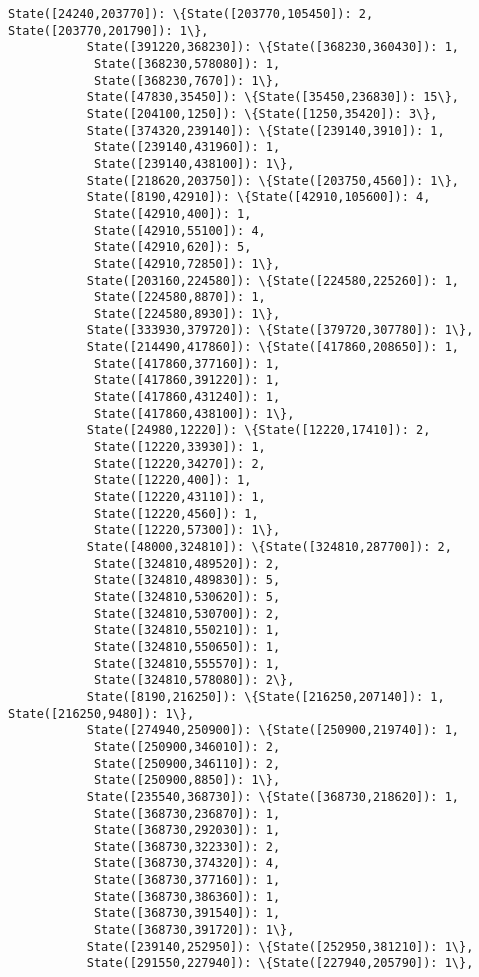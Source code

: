 \documentclass[11pt]{article}
\begin{document}
\begin{Verbatim}[commandchars=\\\{\}]
           State([24240,203770]): \{State([203770,105450]): 2, State([203770,201790]): 1\},
           State([391220,368230]): \{State([368230,360430]): 1,
            State([368230,578080]): 1,
            State([368230,7670]): 1\},
           State([47830,35450]): \{State([35450,236830]): 15\},
           State([204100,1250]): \{State([1250,35420]): 3\},
           State([374320,239140]): \{State([239140,3910]): 1,
            State([239140,431960]): 1,
            State([239140,438100]): 1\},
           State([218620,203750]): \{State([203750,4560]): 1\},
           State([8190,42910]): \{State([42910,105600]): 4,
            State([42910,400]): 1,
            State([42910,55100]): 4,
            State([42910,620]): 5,
            State([42910,72850]): 1\},
           State([203160,224580]): \{State([224580,225260]): 1,
            State([224580,8870]): 1,
            State([224580,8930]): 1\},
           State([333930,379720]): \{State([379720,307780]): 1\},
           State([214490,417860]): \{State([417860,208650]): 1,
            State([417860,377160]): 1,
            State([417860,391220]): 1,
            State([417860,431240]): 1,
            State([417860,438100]): 1\},
           State([24980,12220]): \{State([12220,17410]): 2,
            State([12220,33930]): 1,
            State([12220,34270]): 2,
            State([12220,400]): 1,
            State([12220,43110]): 1,
            State([12220,4560]): 1,
            State([12220,57300]): 1\},
           State([48000,324810]): \{State([324810,287700]): 2,
            State([324810,489520]): 2,
            State([324810,489830]): 5,
            State([324810,530620]): 5,
            State([324810,530700]): 2,
            State([324810,550210]): 1,
            State([324810,550650]): 1,
            State([324810,555570]): 1,
            State([324810,578080]): 2\},
           State([8190,216250]): \{State([216250,207140]): 1, State([216250,9480]): 1\},
           State([274940,250900]): \{State([250900,219740]): 1,
            State([250900,346010]): 2,
            State([250900,346110]): 2,
            State([250900,8850]): 1\},
           State([235540,368730]): \{State([368730,218620]): 1,
            State([368730,236870]): 1,
            State([368730,292030]): 1,
            State([368730,322330]): 2,
            State([368730,374320]): 4,
            State([368730,377160]): 1,
            State([368730,386360]): 1,
            State([368730,391540]): 1,
            State([368730,391720]): 1\},
           State([239140,252950]): \{State([252950,381210]): 1\},
           State([291550,227940]): \{State([227940,205790]): 1\},

\end{Verbatim}
\end{document}
